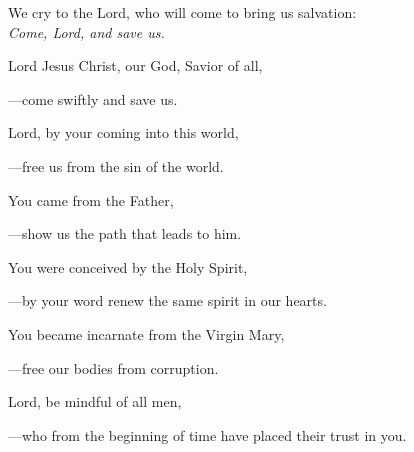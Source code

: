 \intercessions\indent

\begin{hangpar}

We cry to the Lord, who will come to bring us salvation:\\
\emph{Come, Lord, and save us.}

\medskip Lord Jesus Christ, our God, Savior of all,

{\color{red}---\thinspace}come swiftly and save us.

\medskip Lord, by your coming into this world,

{\color{red}---\thinspace}free us from the sin of the world.

\medskip You came from the Father,

{\color{red}---\thinspace}show us the path that leads to him.

\medskip You were conceived by the Holy Spirit,

{\color{red}---\thinspace}by your word renew the same spirit in our hearts.

\medskip You became incarnate from the Virgin Mary,

{\color{red}---\thinspace}free our bodies from corruption.

\medskip Lord, be mindful of all men,

{\color{red}---\thinspace}who from the beginning of time have placed their trust in you.

\end{hangpar}